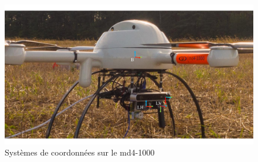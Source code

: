 \begin{figure}[htp]
  \centering
  \includegraphics[width=0.95\linewidth]{images/md41000}
  \caption{Systèmes de coordonnées sur le md4-1000}
  \label{fig:md41000}
\end{figure}

